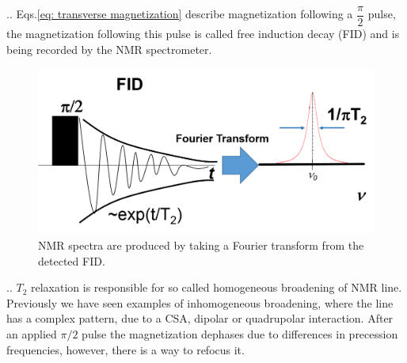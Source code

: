 \documentclass{beamer}
\begin{document}
\begin{frame}{\thesection.\thesubsection. \insertsubsection}
	Eqs.\ref{eq: transverse magnetization} describe magnetization following a $\dfrac{\pi}{2}$ pulse, the magnetization following this pulse is called \alert{free induction decay (FID)} and is being recorded by the NMR spectrometer.
	
	\begin{figure}
		\centering
		\includegraphics[scale=0.4]{figures/FID.png}
		\caption{NMR spectra are produced by taking a Fourier transform from the detected FID.}
	\end{figure}
	
	
	
 \end{frame}
    
 \begin{frame}{\thesection.\thesubsection. \insertsubsection}
    $T_2$ relaxation is responsible for so called \alert{homogeneous} broadening of NMR line. Previously we have seen examples of \alert{inhomogeneous} broadening, where the line has a complex pattern, due to a CSA, dipolar or quadrupolar interaction. After an applied $\pi/2$ pulse the magnetization dephases due to differences in precession frequencies, however, there is a way to refocus it. 
\end{frame}
\end{document}
